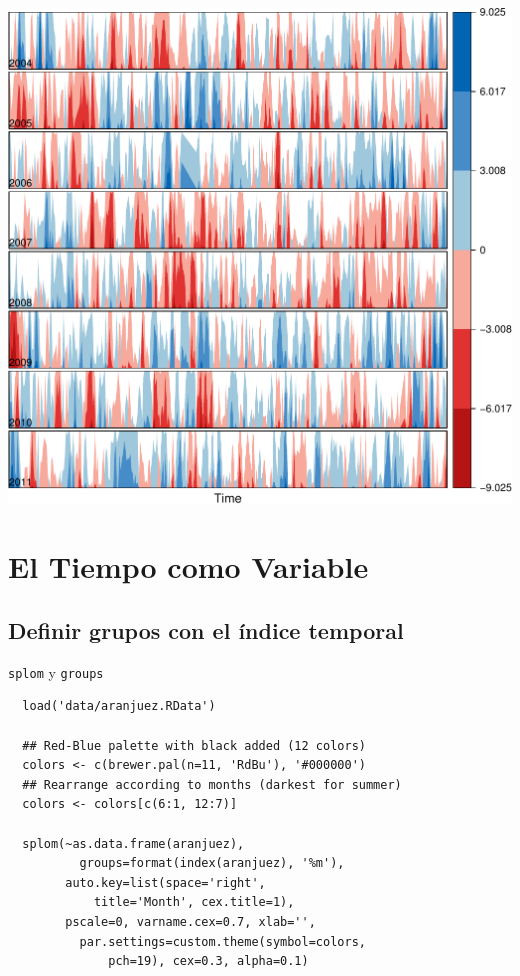 \documentclass[xcolor={usenames,svgnames,dvipsnames}]{beamer}
\begin{document}
\begin{frame}[label=sec-3-3-7]{}
\includegraphics[width=.9\linewidth]{figs/diffTa_horizon.pdf}
\end{frame}


\section{El Tiempo como Variable}
\label{sec-4}

\subsection{Definir grupos con el índice temporal}
\label{sec-4-1}

\begin{frame}[fragile,label=sec-4-1-1]{\texttt{splom} y \texttt{groups}}
 \lstset{language=R,label= ,caption= ,numbers=none}
\begin{lstlisting}
  load('data/aranjuez.RData')
  
  ## Red-Blue palette with black added (12 colors)
  colors <- c(brewer.pal(n=11, 'RdBu'), '#000000')
  ## Rearrange according to months (darkest for summer)
  colors <- colors[c(6:1, 12:7)]
  
  splom(~as.data.frame(aranjuez),
          groups=format(index(aranjuez), '%m'),
        auto.key=list(space='right', 
            title='Month', cex.title=1),
        pscale=0, varname.cex=0.7, xlab='',
          par.settings=custom.theme(symbol=colors,
              pch=19), cex=0.3, alpha=0.1)
\end{lstlisting}
\end{frame}
\end{document}
